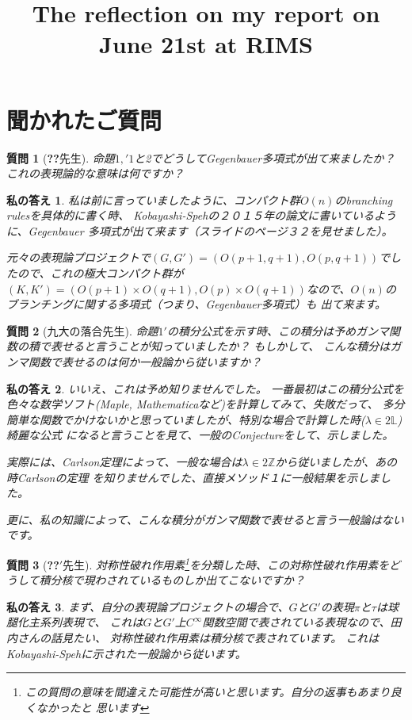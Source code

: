 \documentclass[12pt]{article} %
\title{The reflection on my report on June 21st at RIMS}
\author{}
\newtheorem{question}{質問}
\newtheorem{answer}{私の答え}
\begin{document}
\maketitle
\section{聞かれたご質問}
\begin{question}[\textbf{??}先生]
	命題$1,'1$と2でどうしてGegenbauer多項式が出て来ましたか？
	これの表現論的な意味は何ですか？
\end{question}
\begin{answer}
私は前に言っていましたように、コンパクト群$O(n)$のbranching rulesを具体的に書く時、
Kobayashi-Spehの２０１５年の論文に書いているように、Gegenbauer 多項式が出て来ます{\footnotesize （スライドのページ３２を見せました）}。

元々の表現論プロジェクトで$(G,G')=(O(p+1,q+1),O(p,q+1))$でしたので、これの極大コンパクト群が
$(K,K')=(O(p+1)\times O(q+1),O(p)\times O(q+1))$なので、$O(n)$のブランチングに関する多項式（つまり、Gegenbauer多項式）も
出て来ます。
\end{answer}
\begin{question}[九大の落合先生]
	命題$1'$の積分公式を示す時、この積分は予めガンマ関数の積で表せると言うことが知っていましたか？
	もしかして、
	こんな積分はガンマ関数で表せるのは何か一般論から従いますか？
\end{question}
\begin{answer}
いいえ、これは予め知りませんでした。
一番最初はこの積分公式を色々な数学ソフト(Maple, Mathematicaなど)を計算してみて、失敗だって、
多分簡単な関数でかけないかと思っていましたが、特別な場合で計算した時($\lambda\in2\mathbb{L}$)綺麗な公式
になると言うことを見て、一般のConjectureをして、示しました。

実際には、Carlson定理によって、一般な場合は$\lambda\in 2\mathbb{Z}$から従いましたが、あの時Carlsonの定理
を知りませんでした、直接メソッド１に一般結果を示しました。

更に、私の知識によって、こんな積分がガンマ関数で表せると言う一般論はないです。
\end{answer}
\begin{question}[\textbf{??$'$}先生]
	対称性破れ作用素\footnote{この質問の意味を間違えた可能性が高いと思います。自分の返事もあまり良くなかったと
	思います}を分類した時、この対称性破れ作用素をどうして積分核で現わされているものしか出てこないですか？
\end{question}
\begin{answer}
	まず、自分の表現論プロジェクトの場合で、$G$と$G'$の表現$\pi$と$\tau$は球腿化主系列表現で、
	これは$G$と$G'$上$C^\infty$関数空間で表されている表現なので、田内さんの話見たい、
	対称性破れ作用素は積分核で表されています。
	これはKobayashi-Spehに示された一般論から従います。
\end{answer}
\end{document}
